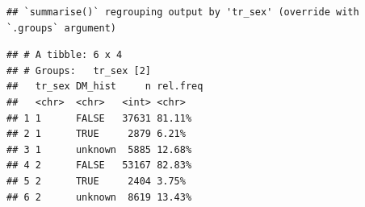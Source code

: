 \documentclass[
]{article}
\newenvironment{Shaded}{\begin{snugshade}}{\end{snugshade}}
\newcommand{\DataTypeTok}[1]{\textcolor[rgb]{0.13,0.29,0.53}{#1}}
\newcommand{\DecValTok}[1]{\textcolor[rgb]{0.00,0.00,0.81}{#1}}
\newcommand{\KeywordTok}[1]{\textcolor[rgb]{0.13,0.29,0.53}{\textbf{#1}}}
\newcommand{\NormalTok}[1]{#1}
\newcommand{\OperatorTok}[1]{\textcolor[rgb]{0.81,0.36,0.00}{\textbf{#1}}}
\newcommand{\OtherTok}[1]{\textcolor[rgb]{0.56,0.35,0.01}{#1}}
\newcommand{\StringTok}[1]{\textcolor[rgb]{0.31,0.60,0.02}{#1}}
\begin{document}
\begin{Shaded}
\end{Shaded}

\begin{verbatim}
## `summarise()` regrouping output by 'tr_sex' (override with `.groups` argument)
\end{verbatim}

\begin{verbatim}
## # A tibble: 6 x 4
## # Groups:   tr_sex [2]
##   tr_sex DM_hist     n rel.freq
##   <chr>  <chr>   <int> <chr>   
## 1 1      FALSE   37631 81.11%  
## 2 1      TRUE     2879 6.21%   
## 3 1      unknown  5885 12.68%  
## 4 2      FALSE   53167 82.83%  
## 5 2      TRUE     2404 3.75%   
## 6 2      unknown  8619 13.43%
\end{verbatim}

\begin{Shaded}
\end{Shaded}
\end{document}
